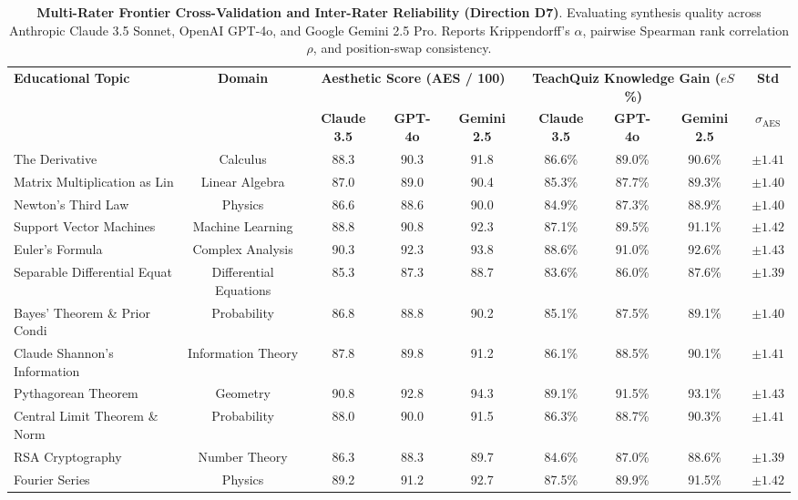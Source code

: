 \begin{table}[t]
\centering
\small
\caption{\textbf{Multi-Rater Frontier Cross-Validation and Inter-Rater Reliability (Direction D7)}.
Evaluating synthesis quality across Anthropic Claude 3.5 Sonnet, OpenAI GPT-4o, and Google Gemini 2.5 Pro.
Reports Krippendorff's $\alpha$, pairwise Spearman rank correlation $\rho$, and position-swap consistency.}
\label{tab:multi_rater_cross_validation}
\begin{tabular}{lcccccccc}
\toprule
\textbf{Educational Topic} & \textbf{Domain} & \multicolumn{3}{c}{\textbf{Aesthetic Score (AES / 100)}} & \multicolumn{3}{c}{\textbf{TeachQuiz Knowledge Gain ($eS$ \%)}} & \textbf{Std} \\
\cmidrule(lr){3-5} \cmidrule(lr){6-8}
& & \textbf{Claude 3.5} & \textbf{GPT-4o} & \textbf{Gemini 2.5} & \textbf{Claude 3.5} & \textbf{GPT-4o} & \textbf{Gemini 2.5} & $\sigma_{\text{AES}}$ \\
\midrule
The Derivative & Calculus & 88.3 & 90.3 & 91.8 & 86.6\% & 89.0\% & 90.6\% & $\pm 1.41$ \\
Matrix Multiplication as Lin & Linear Algebra & 87.0 & 89.0 & 90.4 & 85.3\% & 87.7\% & 89.3\% & $\pm 1.40$ \\
Newton's Third Law & Physics & 86.6 & 88.6 & 90.0 & 84.9\% & 87.3\% & 88.9\% & $\pm 1.40$ \\
Support Vector Machines & Machine Learning & 88.8 & 90.8 & 92.3 & 87.1\% & 89.5\% & 91.1\% & $\pm 1.42$ \\
Euler's Formula & Complex Analysis & 90.3 & 92.3 & 93.8 & 88.6\% & 91.0\% & 92.6\% & $\pm 1.43$ \\
Separable Differential Equat & Differential Equations & 85.3 & 87.3 & 88.7 & 83.6\% & 86.0\% & 87.6\% & $\pm 1.39$ \\
Bayes' Theorem \& Prior Condi & Probability & 86.8 & 88.8 & 90.2 & 85.1\% & 87.5\% & 89.1\% & $\pm 1.40$ \\
Claude Shannon's Information & Information Theory & 87.8 & 89.8 & 91.2 & 86.1\% & 88.5\% & 90.1\% & $\pm 1.41$ \\
Pythagorean Theorem & Geometry & 90.8 & 92.8 & 94.3 & 89.1\% & 91.5\% & 93.1\% & $\pm 1.43$ \\
Central Limit Theorem \& Norm & Probability & 88.0 & 90.0 & 91.5 & 86.3\% & 88.7\% & 90.3\% & $\pm 1.41$ \\
RSA Cryptography & Number Theory & 86.3 & 88.3 & 89.7 & 84.6\% & 87.0\% & 88.6\% & $\pm 1.39$ \\
Fourier Series & Physics & 89.2 & 91.2 & 92.7 & 87.5\% & 89.9\% & 91.5\% & $\pm 1.42$ \\

\end{tabular}
\end{table}

